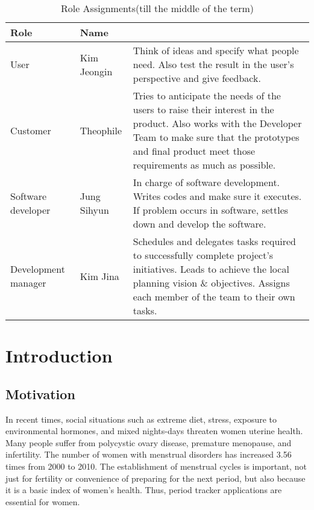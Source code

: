 \documentclass[conference]{IEEEtran}
\begin{document}
\begin{table}[ht!] \renewcommand\arraystretch{1.25}
  \begin{threeparttable}
      \caption{Role Assignments(till the middle of the term)%
      \label{tab:table2}}    %
      \begin{tabular}{@{}l l>{\raggedright\arraybackslash}p{3.8cm}@{}}
      \toprule
      \bfseries Role & \bfseries Name & \multicolumn{1}{l}{\bfseries Task description and etc.} \\
      \midrule
      User & Kim Jeongin & Think of ideas and specify what people need. Also test the result in the user's perspective and give feedback. \\
      Customer & Theophile & Tries to anticipate the needs of the users to raise their interest in the product. Also works with the Developer Team to make sure that the prototypes and final product meet those requirements as much as possible. \\
      Software developer & Jung Sihyun & In charge of software development. Writes codes and make sure it executes. If problem occurs in software, settles down and develop the software. \\
      Development manager & Kim Jina & Schedules and delegates tasks required to successfully complete project's initiatives. Leads to achieve the local planning vision \& objectives. Assigns each member of the team to their own tasks. \\
      \bottomrule
      \end{tabular}
  \end{threeparttable}
\end{table}

\section{Introduction}
\subsection{Motivation}
In recent times, social situations such as extreme diet, stress, exposure to environmental hormones, and mixed nights-days threaten women uterine health. Many people suffer from polycystic ovary disease, premature menopause, and infertility. The number of women with menstrual disorders has increased 3.56 times from 2000 to 2010\cite{b1}. The establishment of menstrual cycles is important, not just for fertility or convenience of preparing for the next period, but also because it is a basic index of women's health. Thus, period tracker applications are essential for women. 
\end{document}
